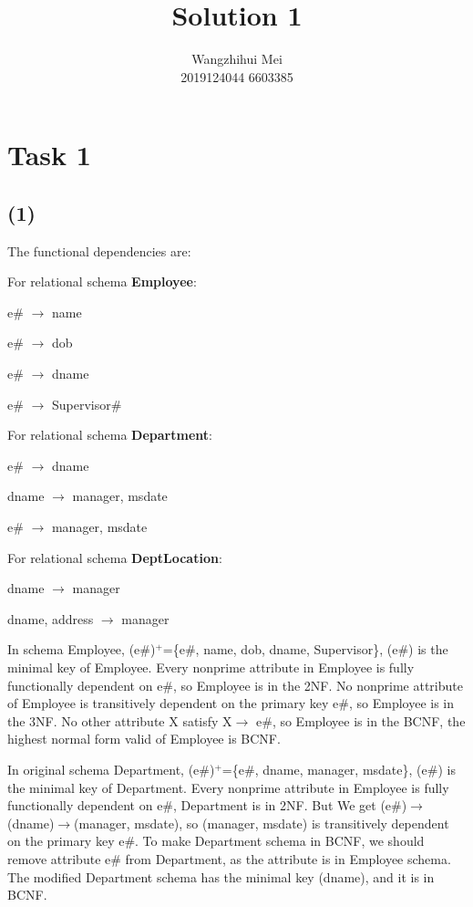\documentclass[12pt]{article}%
\begin{document}
\title{Solution 1}
\author{Wangzhihui Mei \\ 2019124044 6603385}
\date{}
\maketitle

\section*{Task 1}
\subsection*{(1)}
The functional dependencies are:

\noindent For relational schema \textbf{Employee}:

e\# $\rightarrow$ name 

e\# $\rightarrow$ dob

e\# $\rightarrow$ dname

e\# $\rightarrow$ Supervisor\#

\noindent For relational schema \textbf{Department}:

e\# $\rightarrow$ dname

dname $\rightarrow$ manager, msdate

e\# $\rightarrow$ manager, msdate

\noindent For relational schema \textbf{DeptLocation}:

dname $\rightarrow$ manager

dname, address $\rightarrow$ manager

\noindent In schema Employee, (e\#)$^+$=\{e\#, name, dob, dname, Supervisor\}, (e\#) is the minimal key of Employee. 
Every nonprime attribute in Employee is fully functionally dependent on e\#, so Employee is in the 2NF.
No nonprime attribute of Employee is transitively dependent on the primary key e\#, so Employee is in the 3NF.
No other attribute X satisfy X$\rightarrow$ e\#, so Employee is in the BCNF, the highest normal form valid of Employee is BCNF.

\noindent In original schema Department, (e\#)$^+$=\{e\#, dname, manager, msdate\}, (e\#) is the minimal key of Department. Every nonprime attribute in Employee is fully functionally dependent on e\#, Department is in 2NF. 
But We get (e\#)$\rightarrow$(dname)$\rightarrow$(manager, msdate), so (manager, msdate) is transitively dependent on the primary key e\#. To make Department schema in BCNF, we should remove attribute e\# from Department, as the attribute is in Employee schema. The modified Department schema has the minimal key (dname), and it is in BCNF.
\end{document}
